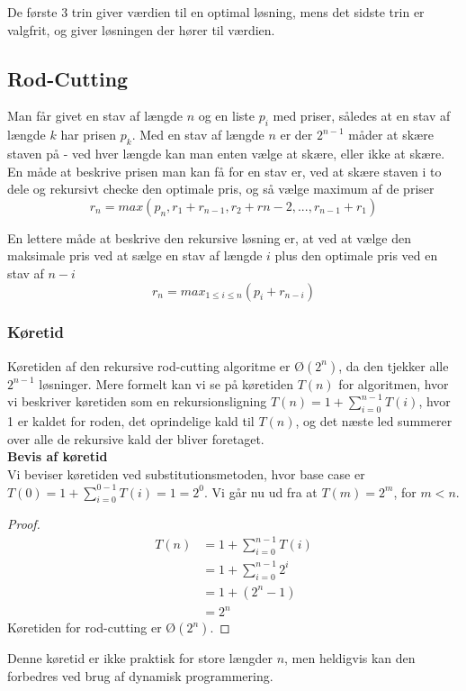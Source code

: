 De første 3 trin giver værdien til en optimal løsning, mens det sidste trin er valgfrit, og giver løsningen der hører til værdien. 

\subsection{Rod-Cutting}
Man får givet en stav af længde $n$ og en liste $p_i$ med priser, således at en stav af længde $k$ har prisen $p_k$. Med en stav af længde $n$ er der $2^{n-1}$ måder at skære staven på - ved hver længde kan man enten vælge at skære, eller ikke at skære.\\
En måde at beskrive prisen man kan få for en stav er, ved at skære staven i to dele og rekursivt checke den optimale pris, og så vælge maximum af de priser
$$r_n = max(p_n, r_1 + r_{n - 1}, r_2 + r{n - 2}, ..., r_{n - 1} + r_1)$$

En lettere måde at beskrive den rekursive løsning er, at ved at vælge den maksimale pris ved at sælge en stav af længde $i$ plus den optimale pris ved en stav af $n-i$
$$r_n= max_{1 \leq i \leq n}(p_i + r_{n-i})$$

\subsubsection{Køretid}
Køretiden af den rekursive rod-cutting algoritme er $Ø(2^n)$, da den tjekker alle $2^{n-1}$ løsninger. Mere formelt kan vi se på køretiden $T(n)$ for algoritmen, hvor vi beskriver køretiden som en rekursionsligning $T(n) = 1 + \sum_{i=0}^{n-1}T(i)$, hvor 1 er kaldet for roden, det oprindelige kald til $T(n)$, og det næste led summerer over alle de rekursive kald der bliver foretaget.\\

\textbf{Bevis af køretid}\\
Vi beviser køretiden ved substitutionsmetoden, hvor base case er $T(0) = 1 + \sum_{i=0}^{0-1}T(i) = 1 = 2^0$. Vi går nu ud fra at $T(m) = 2^m$, for $m < n$.
\begin{proof}
\begin{align*}
  T(n) &= 1 + \sum_{i=0}^{n-1} T(i)\\
       &= 1 + \sum_{i=0}^{n-1} 2^i\\
       &= 1 + (2^n - 1)\\
       &= 2^n
\end{align*}
Køretiden for rod-cutting er $Ø(2^n)$.
\end{proof}

Denne køretid er ikke praktisk for store længder $n$, men heldigvis kan den forbedres ved brug af dynamisk programmering.
